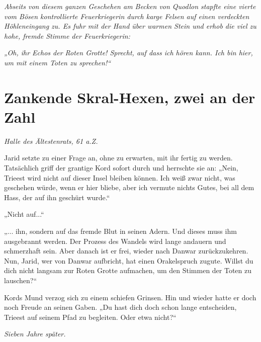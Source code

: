 \textit{Abseits von diesem ganzen Geschehen am Becken von Quodlon stapfte eine vierte vom Bösen kontrollierte Feuerkriegerin durch karge Felsen auf einen verdeckten Höhleneingang zu. Es fuhr mit der Hand über warmen Stein und erhob die viel zu hohe, fremde Stimme der Feuerkriegerin:}

\textit{„Oh, ihr Echos der Roten Grotte! Sprecht, auf dass ich hören kann. Ich bin hier, um mit einem Toten zu sprechen!“}













\newpage
\section{Zankende Skral-Hexen, zwei an der Zahl}





\textit{Halle des Ältestenrats, 61 a.Z.}\bigskip



Jarid setzte zu einer Frage an, ohne zu erwarten, mit ihr fertig zu werden. Tatsächlich griff der grantige Kord sofort durch und herrschte sie an: „Nein, Trieest wird nicht auf dieser Insel bleiben können. Ich weiß zwar nicht, was geschehen würde, wenn er hier bliebe, aber ich vermute nichts Gutes, bei all dem Hass, der auf ihn geschürt wurde.“

„Nicht auf...“

„... ihn, sondern auf das fremde Blut in seinen Adern. Und dieses muss ihm ausgebrannt werden. Der Prozess des Wandels wird lange andauern und schmerzhaft sein. Aber danach ist er frei, wieder nach Danwar zurückzukehren. Nun, Jarid, wer von Danwar aufbricht, hat einen Orakelspruch zugute. Willst du dich nicht langsam zur Roten Grotte aufmachen, um den Stimmen der Toten zu lauschen?“

Kords Mund verzog sich zu einem schiefen Grinsen. Hin und wieder hatte er doch noch Freude an seinen Gaben. „Du hast dich doch schon lange entscheiden, Trieest auf seinem Pfad zu begleiten. Oder etwa nicht?“\bigskip








\textit{Sieben Jahre später.}\bigskip



